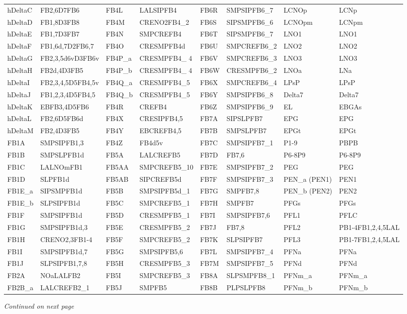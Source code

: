 \documentclass{article}
\begin{document}
\begin{center}
\begin{longtable}{llllllll}
hDeltaC & FB2,6D7FB6 & FB4L & LALSIPFB4 & FB6R & SMPSIPFB6\_7 & LCNOp & LCNp \\
hDeltaD & FB1,8D3FB8 & FB4M & CRENO2FB4\_2 & FB6S & SIPSMPFB6\_6 & LCNOpm & LCNpm \\
hDeltaE & FB1,7D3FB7 & FB4N & SMPCREFB4 & FB6T & SIPSMPFB6\_7 & LNO1 & LNO1 \\
hDeltaF & FB1,6d,7D2FB6,7 & FB4O & CRESMPFB4d & FB6U & SMPCREFB6\_2 & LNO2 & LNO2 \\
hDeltaG & FB2,3,5d6vD3FB6v & FB4P\_a & CRESMPFB4\_ 4 & FB6V & SMPCREFB6\_3 & LNO3 & LNO3 \\
hDeltaH & FB2d,4D3FB5 & FB4P\_b & CRESMPFB4\_ 4 & FB6W & CRESMPFB6\_2 & LNOa & LNa \\
hDeltaI & FB2,3,4,5D5FB4,5v & FB4Q\_a & CRESMPFB4\_5 & FB6X & SMPCREFB6\_4 & LPsP & LPsP \\
hDeltaJ & FB1,2,3,4D5FB4,5 & FB4Q\_b & CRESMPFB4\_5 & FB6Y & SMPSIPFB6\_8 & Delta7 & Delta7 \\
hDeltaK & EBFB3,4D5FB6 & FB4R & CREFB4 & FB6Z & SMPSIPFB6\_9 & EL & EBGAs \\
hDeltaL & FB2,6D5FB6d & FB4X & CRESIPFB4,5 & FB7A & SIPSLPFB7 & EPG & EPG \\
hDeltaM & FB2,4D3FB5 & FB4Y & EBCREFB4,5 & FB7B & SMPSLPFB7 & EPGt & EPGt \\
FB1A & SMPSIPFB1,3 & FB4Z & FB4d5v & FB7C & SMPSIPFB7\_1 & P1-9 & PBPB \\
FB1B & SMPSLPFB1d & FB5A & LALCREFB5 & FB7D & FB7,6 & P6-8P9 & P6-8P9 \\
FB1C & LALNOmFB1 & FB5AA & SMPCREFB5\_10 & FB7E & SMPSIPFB7\_2 & PEG & PEG \\
FB1D & SLPFB1d & FB5AB & SIPCREFB5d & FB7F & SMPSIPFB7\_3 & PEN\_a (PEN1) & PEN1 \\
FB1E\_a & SIPSMPFB1d & FB5B & SMPSIPFB5d\_1 & FB7G & SMPFB7,8 & PEN\_b (PEN2) & PEN2 \\
FB1E\_b & SLPSIPFB1d & FB5C & SMPCREFB5\_1 & FB7H & SMPFB7 & PFGs & PFGs \\
FB1F & SMPSIPFB1d & FB5D & CRESMPFB5\_1 & FB7I & SMPSIPFB7,6 & PFL1 & PFLC \\
FB1G & SMPSIPFB1d,3 & FB5E & CRESMPFB5\_2 & FB7J & FB7,8 & PFL2 & PB1-4FB1,2,4,5LAL \\
FB1H & CRENO2,3FB1-4 & FB5F & SMPCREFB5\_2 & FB7K & SLPSIPFB7 & PFL3 & PB1-7FB1,2,4,5LAL \\
FB1I & SMPSIPFB1d,7 & FB5G & SMPSIPFB5,6 & FB7L & SMPSIPFB7\_4 & PFNa & PFNa \\
FB1J & SLPSIPFB1,7,8 & FB5H & CRESMPFB5\_3 & FB7M & SMPSIPFB7\_5 & PFNd & PFNd \\
FB2A & NOaLALFB2 & FB5I & SMPCREFB5\_3 & FB8A & SLPSMPFB8\_1 & PFNm\_a & PFNm\_a \\
FB2B\_a & LALCREFB2\_1 & FB5J & SMPFB5 & FB8B & PLPSLPFB8 & PFNm\_b & PFNm\_b \\
\end{longtable}
\end{center}
\noindent\emph{Continued on next page}
\end{document}
